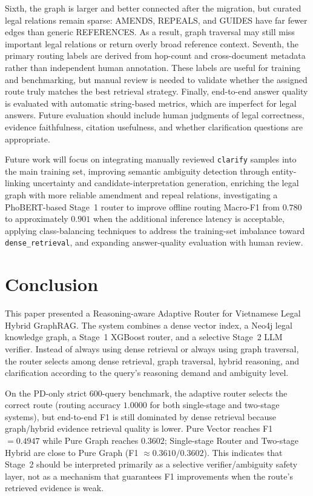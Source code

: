 \documentclass[11pt,twocolumn]{article}
\begin{document}
Sixth, the graph is larger and better connected after the
migration, but curated legal relations remain sparse:
\textsc{AMENDS}, \textsc{REPEALS}, and \textsc{GUIDES} have
far fewer edges than generic \textsc{REFERENCES}. As a
result, graph traversal may still miss important legal
relations or return overly broad reference context. Seventh,
the primary routing labels are derived from hop-count and
cross-document metadata rather than independent human
annotation. These labels are useful for training and
benchmarking, but manual review is needed to validate whether
the assigned route truly matches the best retrieval strategy.
Finally, end-to-end answer quality is evaluated with
automatic string-based metrics, which are imperfect for legal
answers. Future evaluation should include human judgments of
legal correctness, evidence faithfulness, citation usefulness,
and whether clarification questions are appropriate.

Future work will focus on integrating manually reviewed
\texttt{clarify} samples into the main training set,
improving semantic ambiguity detection through entity-linking
uncertainty and candidate-interpretation generation,
enriching the legal graph with more reliable amendment and
repeal relations, investigating a PhoBERT-based Stage~1
router to improve offline routing Macro-F1 from $0.780$ to
approximately $0.901$ when the additional inference latency
is acceptable, applying class-balancing techniques to address
the training-set imbalance toward \texttt{dense\_retrieval},
and expanding answer-quality evaluation with human review.

\section{Conclusion}
\label{sec:conclusion}

This paper presented a Reasoning-aware Adaptive Router for
Vietnamese Legal Hybrid GraphRAG. The system combines a dense
vector index, a Neo4j legal knowledge graph, a Stage~1 XGBoost
router, and a selective Stage~2 LLM verifier. Instead of
always using dense retrieval or always using graph traversal,
the router selects among dense retrieval, graph traversal,
hybrid reasoning, and clarification according to the query's
reasoning demand and ambiguity level.

On the PD-only strict $600$-query benchmark, the adaptive router
selects the correct route (routing accuracy $1.0000$ for both
single-stage and two-stage systems), but end-to-end F1 is still
dominated by dense retrieval because graph/hybrid evidence
retrieval quality is lower. Pure Vector reaches F1 $=0.4947$
while Pure Graph reaches $0.3602$; Single-stage Router and
Two-stage Hybrid are close to Pure Graph (F1 $\approx 0.3610/0.3602$).
This indicates that Stage~2 should be interpreted primarily as
a selective verifier/ambiguity safety layer, not as a mechanism
that guarantees F1 improvements when the route's retrieved
evidence is weak.
\end{document}
